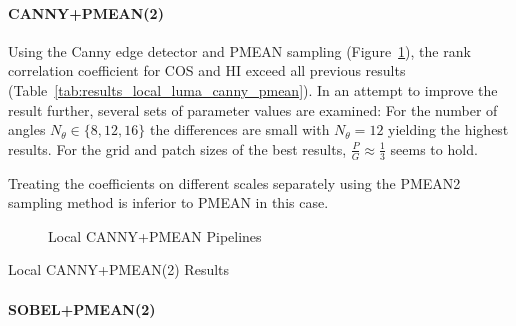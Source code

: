 \FloatBarrier
\paragraph{CANNY+PMEAN(2)}

Using the Canny edge detector and PMEAN sampling
(Figure~\ref{fig:pipeline_local_luma_canny_pmean}), the rank correlation
coefficient for COS and HI exceed all previous results
(Table~\ref{tab:results_local_luma_canny_pmean}). In an attempt to improve the
result further, several sets of parameter values are examined: For the number
of angles $N_{\theta} \in \{8, 12, 16\}$ the differences are small with
$N_{\theta} = 12$ yielding the highest results. For the grid and patch sizes of
the best results, $\frac{P}{G} \approx \frac{1}{3}$ seems to hold.

Treating the coefficients on different scales separately using the PMEAN2
sampling method is inferior to PMEAN in this case.

\begin{figure}[h!]
    \centering
    
    \caption[Local CANNY+PMEAN Pipelines]{
        Local CANNY+PMEAN Pipelines
    }
    \label{fig:pipeline_local_luma_canny_pmean}
\end{figure}

\begin{table}[h!]
    \centering
    \quad
    \caption[Local CANNY+PMEAN(2) Results]{
        Local CANNY+PMEAN(2) Results
    }
    \label{tab:results_local_luma_canny_pmean_all}
\end{table}

\FloatBarrier
\paragraph{SOBEL+PMEAN(2)}

